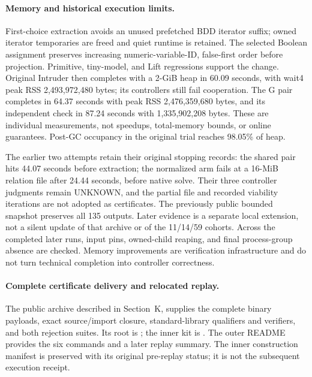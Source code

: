 \paragraph{Memory and historical execution limits.}
First-choice extraction avoids an unused prefetched BDD iterator suffix;
owned iterator temporaries are freed and quiet runtime is retained.
The selected Boolean assignment preserves increasing numeric-variable-ID,
false-first order before projection. Primitive, tiny-model, and Lift
regressions support the change. Original Intruder then completes with
a 2-GiB heap in 60.09 seconds, with wait4 peak RSS 2,493,972,480 bytes;
its controllers still fail cooperation. The G pair completes in
64.37 seconds with peak RSS 2,476,359,680 bytes, and its independent
check in 87.24 seconds with 1,335,902,208 bytes. These are individual
measurements, not speedups, total-memory bounds, or online guarantees.
Post-GC occupancy in the original trial reaches 98.05\% of heap.

The earlier two attempts retain their original stopping records: the
shared pair hits 44.07 seconds before extraction; the normalized arm
fails at a 16-MiB relation file after 24.44 seconds, before native solve.
Their three controller judgments remain UNKNOWN, and the partial file
and recorded viability iterations are not adopted as certificates.
The previously public bounded snapshot preserves all 135 outputs.
Later evidence is a separate local extension, not a silent update of
that archive or of the 11/14/59 cohorts. Across the completed later
runs, input pins, owned-child reaping, and final process-group absence
are checked. Memory improvements are verification infrastructure and
do not turn technical completion into controller correctness.

\paragraph{Complete certificate delivery and relocated replay.}
The public archive described in Section~K,
 supplies the complete
binary payloads, exact source/import closure, standard-library
qualifiers and verifiers, and both rejection suites. Its root is
; the inner kit is
. The outer README
provides the six commands and a later replay summary. The inner
construction manifest is preserved with its original pre-replay status;
it is not the subsequent execution receipt.

